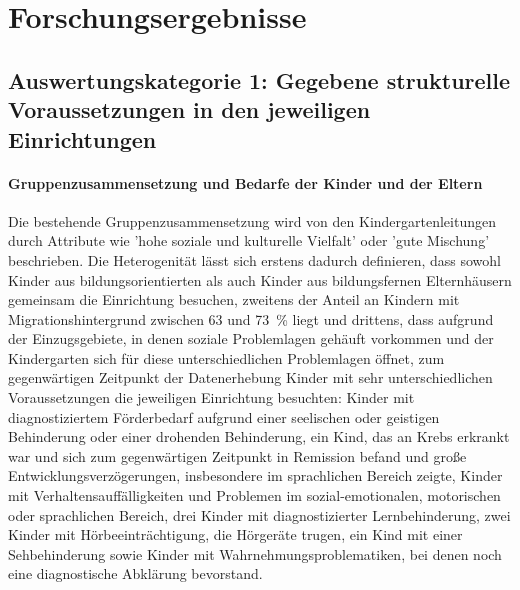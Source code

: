 \section{Forschungsergebnisse}
 
\subsection{Auswertungskategorie 1: Gegebene strukturelle Voraussetzungen in den jeweiligen Einrichtungen}

\paragraph{Gruppenzusammensetzung und Bedarfe der Kinder und der Eltern}
Die bestehende Gruppenzusammensetzung wird von den Kindergartenleitungen durch Attribute wie 'hohe soziale und kulturelle Vielfalt' oder 'gute Mischung' beschrieben. Die Heterogenität lässt sich erstens dadurch definieren, dass sowohl Kinder aus bildungsorientierten als auch Kinder aus bildungsfernen Elternhäusern gemeinsam die Einrichtung besuchen, zweitens der Anteil an Kindern mit Migrationshintergrund zwischen 63 und 73 \,\% liegt und drittens, dass aufgrund der Einzugsgebiete, in denen soziale Problemlagen gehäuft vorkommen und der Kindergarten sich für diese unterschiedlichen Problemlagen öffnet, zum gegenwärtigen Zeitpunkt der Datenerhebung Kinder mit sehr unterschiedlichen Voraussetzungen die jeweiligen Einrichtung besuchten: 
Kinder mit diagnostiziertem Förderbedarf aufgrund einer seelischen oder geistigen Behinderung oder einer drohenden Behinderung, ein Kind, das an Krebs erkrankt war und sich zum gegenwärtigen Zeitpunkt in Remission befand und große Entwicklungsverzögerungen, insbesondere im sprachlichen Bereich zeigte, Kinder mit Verhaltensauffälligkeiten und Problemen im sozial-emotionalen, motorischen oder sprachlichen Bereich, drei Kinder mit diagnostizierter Lernbehinderung, zwei Kinder mit Hörbeeinträchtigung, die Hörgeräte trugen, ein Kind mit einer Sehbehinderung sowie Kinder mit Wahrnehmungsproblematiken, bei denen noch eine diagnostische Abklärung bevorstand.

